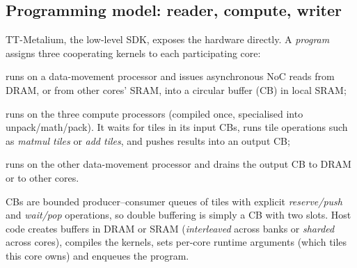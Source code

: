 \subsection{Programming model: reader, compute, writer}

TT-Metalium, the low-level SDK, exposes the hardware directly. A \emph{program} assigns three
cooperating kernels to each participating core:
\begin{description}[leftmargin=1.9cm, style=nextline]
  \item[reader] runs on a data-movement processor and issues asynchronous NoC reads from DRAM, or from
    other cores' SRAM, into a circular buffer (CB) in local SRAM;
  \item[compute] runs on the three compute processors (compiled once, specialised into
    unpack/math/pack). It waits for tiles in its input CBs, runs tile operations such as
    \emph{matmul tiles} or \emph{add tiles}, and pushes results into an output CB;
  \item[writer] runs on the other data-movement processor and drains the output CB to DRAM or to
    other cores.
\end{description}
CBs are bounded producer--consumer queues of tiles with explicit \emph{reserve/push} and
\emph{wait/pop} operations, so double buffering is simply a CB with two slots. Host code creates
buffers in DRAM or SRAM (\emph{interleaved} across banks or \emph{sharded} across cores), compiles
the kernels, sets per-core runtime arguments (which tiles this core owns) and enqueues the
program.

